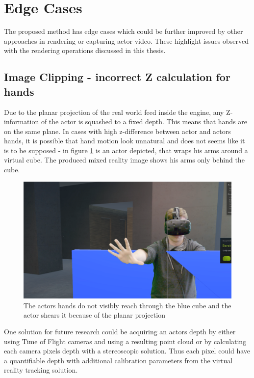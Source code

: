 \section{Edge Cases}

The proposed method has edge cases which could be further improved by other 
approaches in rendering or capturing actor video. These highlight issues 
observed with the rendering operations discussed in this thesis.

\subsection{Image Clipping - incorrect Z calculation for hands}

Due to the planar projection of the real world feed inside the engine, any 
Z-information of the actor is squashed to a fixed depth. This means that hands 
are on the same plane. In cases with high z-difference between actor and actors 
hands, it is possible that hand motion look unnatural and does not seems like 
it is to be supposed - in figure \ref{fig:edge:z-clipping} is an actor 
depicted, that wraps his arms around a virtual cube. The produced mixed reality 
image shows his arms only behind the cube.

\begin{figure}[htb]
	\centering
	\includegraphics[width=\textwidth]{gfx/issues/z-clipping.png}
	\caption{The actors hands do not visibly reach through the blue cube and 
	the actor shears it because of the planar projection}
	\label{fig:edge:z-clipping}
\end{figure}

One solution for future research could be acquiring an actors depth by either 
using Time of Flight cameras and using a resulting point cloud or by 
calculating each camera pixels depth with a stereoscopic solution. Thus each 
pixel could have a quantifiable depth with additional calibration parameters 
from the virtual reality tracking solution.

